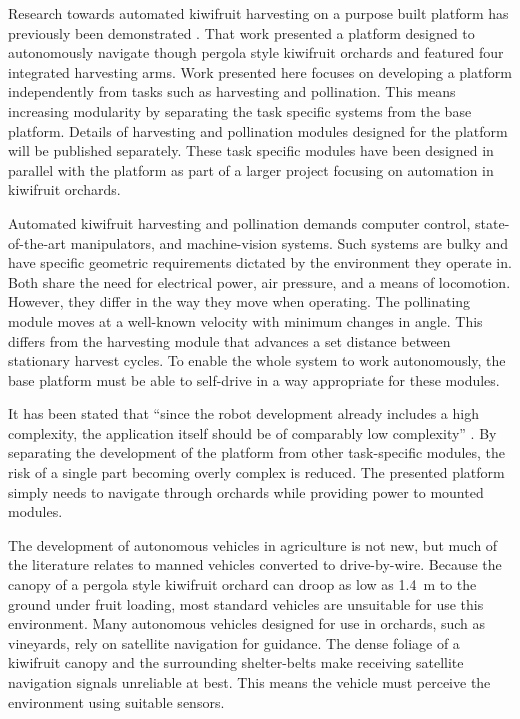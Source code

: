 \documentclass[preprint,authoryear,12pt]{elsarticle}
\begin{document}
    Research towards automated kiwifruit harvesting on a purpose built platform has previously been demonstrated \citep{Scarfe2012}.
    That work presented a platform designed to autonomously navigate though pergola style kiwifruit orchards and featured four integrated harvesting arms.
    Work presented here focuses on developing a platform independently from tasks such as harvesting and pollination.
    This means increasing modularity by separating the task specific systems from the base platform.
    Details of harvesting and pollination modules designed for the platform will be published separately.
    These task specific modules have been designed in parallel with the platform as part of a larger project focusing on automation in kiwifruit orchards.

    Automated kiwifruit harvesting and pollination demands computer control, state-of-the-art manipulators, and machine-vision systems.
    Such systems are bulky and have specific geometric requirements dictated by the environment they operate in.
    Both share the need for electrical power, air pressure, and a means of locomotion.
    However, they differ in the way they move when operating.
    The pollinating module moves at a well-known velocity with minimum changes in angle.
    This differs from the harvesting module that advances a set distance between stationary harvest cycles.
    To enable the whole system to work autonomously, the base platform must be able to self-drive in a way appropriate for these modules.

    It has been stated that ``since the robot development already includes a high complexity, the application itself should be of comparably low complexity'' \citep{Ruckelshausen2009}.
    By separating the development of the platform from other task-specific modules, the risk of a single part becoming overly complex is reduced.
    The presented platform simply needs to navigate through orchards while providing power to mounted modules.

    The development of autonomous vehicles in agriculture is not new, but much of the literature relates to manned vehicles converted to drive-by-wire.
    Because the canopy of a pergola style kiwifruit orchard can droop as low as \SI{1.4}{\meter} to the ground under fruit loading, most standard vehicles are unsuitable for use this environment.
    Many autonomous vehicles designed for use in orchards, such as vineyards, rely on satellite navigation for guidance.
    The dense foliage of a kiwifruit canopy and the surrounding shelter-belts make receiving satellite navigation signals unreliable at best.
    This means the vehicle must perceive the environment using suitable sensors.
\end{document}
